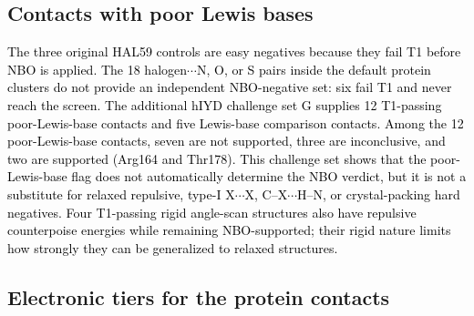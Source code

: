 \documentclass[journal=jcisd8,manuscript=article,layout=two-column]{achemso}
\newcommand{\tcb}[1]{{\textcolor{black}{#1}}}
\begin{document}
\subsection{Contacts with poor Lewis bases}
\tcb{The three original HAL59 controls are easy negatives because they fail T1 before NBO is applied. The 18 halogen$\cdots$N, O, or S pairs inside the default protein clusters do not provide an independent NBO-negative set: six fail T1 and never reach the screen. The additional hIYD challenge set G supplies 12 T1-passing poor-Lewis-base contacts and five Lewis-base comparison contacts. Among the 12 poor-Lewis-base contacts, seven are not supported, three are inconclusive, and two are supported (Arg164 and Thr178). This challenge set shows that the poor-Lewis-base flag does not automatically determine the NBO verdict, but it is not a substitute for relaxed repulsive, type-I X$\cdots$X, C--X$\cdots$H--N, or crystal-packing hard negatives. Four T1-passing rigid angle-scan structures also have repulsive counterpoise energies while remaining NBO-supported; their rigid nature limits how strongly they can be generalized to relaxed structures.}

\subsection{Electronic tiers for the protein contacts}
\end{document}

